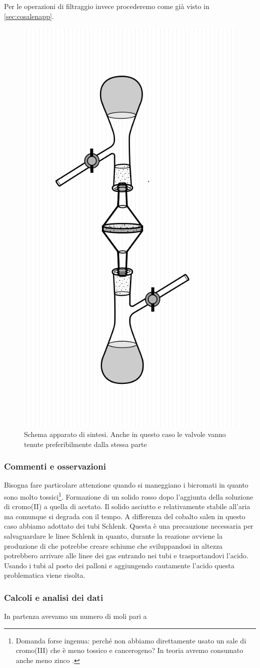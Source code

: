 Per le operazioni di filtraggio invece procederemo come già visto in \autoref{sec:cosalenapp}.



\begin{figure}[ht!]
    \centering
    \includegraphics[width=0.3\linewidth]{foto/apparatooliva.png}
    \caption{Schema apparato di sintesi. Anche in questo caso le valvole vanno tenute preferibilmente dalla stessa parte}
    \label{fig:cracetao}
\end{figure}


\subsubsection{Commenti e osservazioni}

Bisogna fare particolare attenzione quando si maneggiano i bicromati in quanto sono molto tossici\footnote{Domanda forse ingenua: perché non abbiamo direttamente usato un sale di cromo(III) che è meno tossico e cancerogeno? In teoria avremo consumato anche meno zinco  \cite{cancer}.}. 
Formazione di un solido rosso dopo l'aggiunta della soluzione di cromo(II) a quella di acetato. 
Il solido asciutto e relativamente stabile all'aria ma comunque si degrada con il tempo. A differenza del cobalto salen in questo caso abbiamo adottato dei tubi Schlenk. Questa è una precauzione necessaria per salvaguardare le linee Schlenk in quanto, durante la reazione avviene la produzione di  che potrebbe creare schiume che sviluppandosi in altezza potrebbero arrivare alle linee dei gas entrando nei tubi e trasportandovi l'acido. Usando i tubi al posto dei palloni e aggiungendo cautamente l'acido questa problematica viene risolta.


\subsubsection{Calcoli e analisi dei dati}
In partenza avevamo un numero di moli pari a


